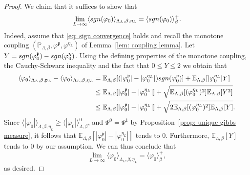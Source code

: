 \documentclass[11pt,a4paper]{article}
\theoremstyle{definition}
\numberwithin{equation}{section}
\begin{document}
\begin{proof}
We claim that it suffices to show that  
\begin{equation}\label{eq: sign convergence}
\lim_{L\to\infty}\langle \textup{sgn}(\varphi_0) \rangle_{\Lambda_L,\beta,\eta_L}= \langle \textup{sgn}(\varphi_0) \rangle^+_{\beta}.    
\end{equation}
Indeed, assume that \eqref{eq: sign convergence} holds and recall the monotone coupling $(\mathbb{P}_{\Lambda,\beta},\varphi^{\mathfrak{p}},\varphi^{\eta_L})$ of Lemma~\ref{lem: coupling lemma}. Let $Y=\textup{sgn}(\varphi^{\mathfrak{p}}_0)-\textup{sgn}(\varphi^{\eta}_0)$. Using the defining properties of the monotone coupling, the Cauchy-Schwarz inequality and the fact that $0\leq Y\leq 2$ we obtain that 
\begin{equation}
\begin{aligned}
\langle \varphi_0\rangle_{\Lambda_L,\beta,\mathfrak{p}_L}-\langle \varphi_0\rangle_{\Lambda_L,\beta,\eta_L}&=\mathbb{E}_{\Lambda,\beta}[(|\varphi^{\mathfrak{p}}_0|-|\varphi^{\eta_L}_0|)\textup{sgn}(\varphi^{\mathfrak{p}}_0)]+\mathbb{E}_{\Lambda,\beta}[|\varphi^{\eta_L}_0|Y] \\  
&\leq \mathbb{E}_{\Lambda,\beta}[|\varphi^{\mathfrak{p}}_0|-|\varphi^{\eta_L}_0|]+\sqrt{\mathbb{E}_{\Lambda,\beta}[(\varphi^{\eta_L}_0)^2]\mathbb{E}_{\Lambda,\beta}[Y^2]} \\
&\leq \mathbb{E}_{\Lambda,\beta}[|\varphi^{\mathfrak{p}}_0|-|\varphi^{\eta_L}_0|]+\sqrt{2\mathbb{E}_{\Lambda,\beta}[(\varphi^{\eta_L}_0)^2]\mathbb{E}_{\Lambda,\beta}[Y]}.
\end{aligned}  
\end{equation}
Since $\langle |\varphi_0|\rangle_{\Lambda,\beta,\eta_L}\geq \langle |\varphi_0|\rangle^0_{\Lambda,\beta}$, and $\Psi^0=\Psi^1$ by Proposition~\ref{prop: unique gibbs measure}, it follows that $\mathbb{E}_{\Lambda,\beta}[|\varphi^{\mathfrak{p}}_0|-|\varphi^{\eta_L}_0|]$ tends to $0$. Furthermore, $\mathbb{E}_{\Lambda,\beta}[Y]$ tends to $0$ by our assumption. We can thus conclude that 
\begin{equation}
\lim_{L\to\infty}\langle \varphi_0 \rangle_{\Lambda_L,\beta,\eta_L}= \langle \varphi_0 \rangle^+_{\beta}, 
\end{equation}
as desired.


\end{proof}
\end{document}
